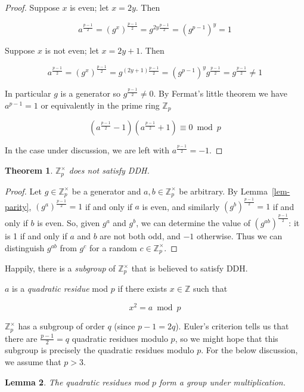 \documentclass[12pt,a4paper]{article}
\newtheorem{theorem}{Theorem}
\newtheorem{lemma}[theorem]{Lemma}
\theoremstyle{definition}
\begin{document}
\begin{proof}
    Suppose $x$ is even; let $x=2y$. Then

    $$a^{\frac{p-1}{2}}=(g^x)^{\frac{p-1}{2}}=g^{2y\frac{p-1}{2}}=(g^{p-1})^y=1$$

    Suppose $x$ is not even; let $x=2y+1$. Then

    $$a^{\frac{p-1}{2}}=(g^x)^{\frac{p-1}{2}}=g^{(2y+1)\frac{p-1}{2}}=(g^{p-1})^yg^{\frac{p-1}{2}}=g^{\frac{p-1}{2}}\neq 1$$

    In particular $g$ is a generator so $g^\frac{p-1}{2}\neq 0$. By Fermat's little theorem we have $a^{p-1}=1$ or equivalently in the prime ring $\mathbb{Z}_p$

    $$\left(a^\frac{p-1}{2}-1\right)\left(a^\frac{p-1}{2}+1\right)\equiv 0\bmod p$$
    
    In the case under discussion, we are left with $a^\frac{p-1}{2}=-1$.
\end{proof}
\begin{theorem}
    $\mathbb{Z}^\times_p$ does not satisfy DDH.
\end{theorem}
\begin{proof}
    Let $g\in\mathbb{Z}^\times_p$ be a generator and $a,b\in\mathbb{Z}^\times_p$ be arbitrary. By Lemma~\ref{lem-parity}, $(g^a)^{\frac{p-1}{2}}=1$ if and only if $a$ is even, and similarly $(g^b)^{\frac{p-1}{2}}=1$ if and only if $b$ is even. So, given $g^a$ and $g^b$, we can determine the value of $\left(g^{ab}\right)^\frac{p-1}{2}$: it is 1 if and only if $a$ and $b$ are not both odd, and $-1$ otherwise. Thus we can distinguish $g^{ab}$ from $g^c$ for a random $c\in\mathbb{Z}^\times_p$.
\end{proof}
Happily, there is a \textit{subgroup} of $\mathbb{Z}^\times_p$ that is believed to satisfy DDH.
\begin{definition}
    $a$ is a \textit{quadratic residue} mod $p$ if there exists $x\in\mathbb{Z}$ such that

    $$x^2=a\bmod p$$

\end{definition}
$\mathbb{Z}^\times_p$ has a subgroup of order $q$ (since $p-1=2q$). Euler's criterion tells us that there are $\frac{p-1}{2}=q$ quadratic residues modulo $p$, so we might hope that this subgroup is precisely the quadratic residues modulo $p$. For the below discussion, we assume that $p>3$.
\begin{lemma}
    The quadratic residues mod $p$ form a group under multiplication.
\end{lemma}
\end{document}
